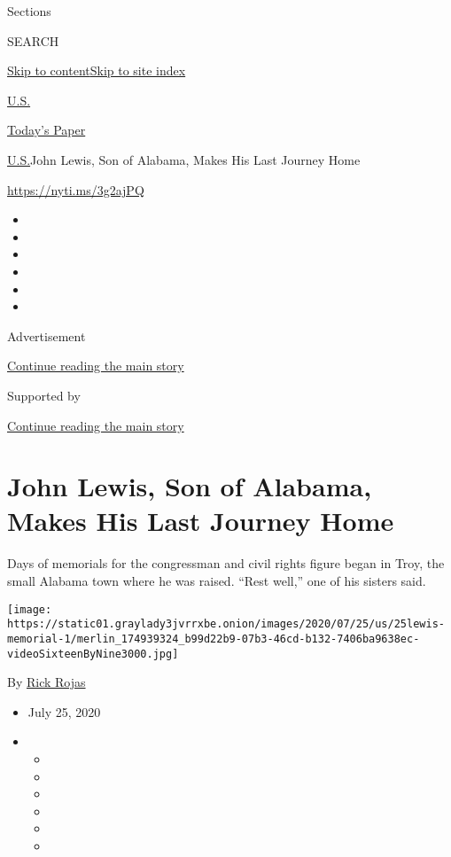Sections

SEARCH

\protect\hyperlink{site-content}{Skip to
content}\protect\hyperlink{site-index}{Skip to site index}

\href{https://www.nytimes3xbfgragh.onion/section/us}{U.S.}

\href{https://myaccount.nytimes3xbfgragh.onion/auth/login?response_type=cookie\&client_id=vi}{}

\href{https://www.nytimes3xbfgragh.onion/section/todayspaper}{Today's
Paper}

\href{/section/us}{U.S.}\textbar{}John Lewis, Son of Alabama, Makes His
Last Journey Home

\url{https://nyti.ms/3g2ajPQ}

\begin{itemize}
\item
\item
\item
\item
\item
\item
\end{itemize}

Advertisement

\protect\hyperlink{after-top}{Continue reading the main story}

Supported by

\protect\hyperlink{after-sponsor}{Continue reading the main story}

\hypertarget{john-lewis-son-of-alabama-makes-his-last-journey-home}{%
\section{John Lewis, Son of Alabama, Makes His Last Journey
Home}\label{john-lewis-son-of-alabama-makes-his-last-journey-home}}

Days of memorials for the congressman and civil rights figure began in
Troy, the small Alabama town where he was raised. ``Rest well,'' one of
his sisters said.

\texttt{[image: https://static01.graylady3jvrrxbe.onion/images/2020/07/25/us/25lewis-memorial-1/merlin\_174939324\_b99d22b9-07b3-46cd-b132-7406ba9638ec-videoSixteenByNine3000.jpg]}

By \href{https://www.nytimes3xbfgragh.onion/by/rick-rojas}{Rick Rojas}

\begin{itemize}
\item
  July 25, 2020
\item
  \begin{itemize}
  \item
  \item
  \item
  \item
  \item
  \item
  \end{itemize}
\end{itemize}


